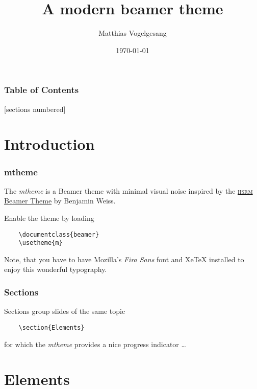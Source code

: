 \documentclass[10pt]{beamer}
\title{A modern beamer theme}
\subtitle{}
\date{\today}
\author{Matthias Vogelgesang}
\institute{Institute or miscellaneous information}
\begin{document}
\maketitle

\begin{frame}
  \frametitle{Table of Contents}
  [sections numbered]
  \tableofcontents[hideallsubsections]
\end{frame}

\section{Introduction}

\begin{frame}[fragile]
  \frametitle{mtheme}

  The \emph{mtheme} is a Beamer theme with minimal visual noise inspired by the
  \href{https://github.com/hsrmbeamertheme/hsrmbeamertheme}{\textsc{hsrm} Beamer
  Theme} by Benjamin Weiss.

  Enable the theme by loading

  \begin{verbatim}    \documentclass{beamer}
    \usetheme{m}\end{verbatim}

  Note, that you have to have Mozilla's \emph{Fira Sans} font and XeTeX
  installed to enjoy this wonderful typography.
\end{frame}

\begin{frame}[fragile]
  \frametitle{Sections}
  Sections group slides of the same topic

  \begin{verbatim}    \section{Elements}\end{verbatim}

  for which the \emph{mtheme} provides a nice progress indicator \ldots
\end{frame}

\section{Elements}
\end{document}

